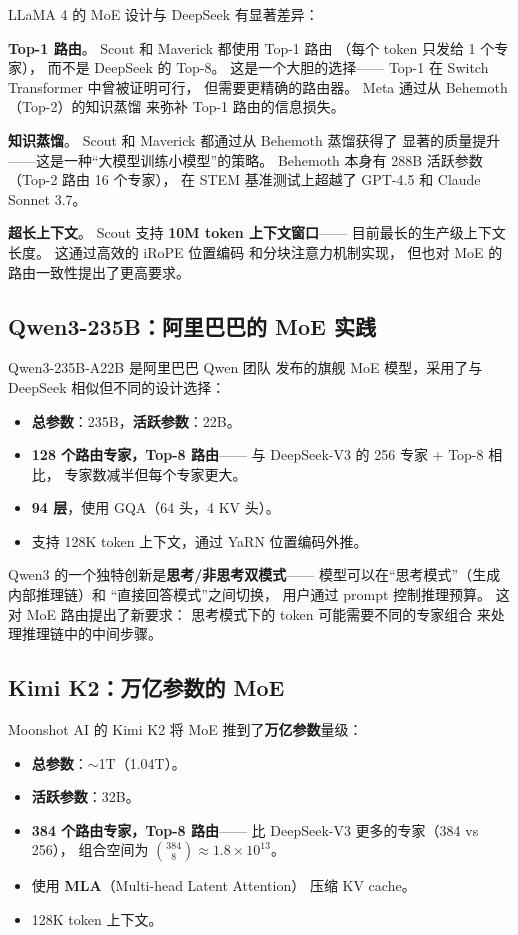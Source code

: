 LLaMA 4 的 MoE 设计与 DeepSeek 有显著差异：

\textbf{Top-1 路由}。
Scout 和 Maverick 都使用 Top-1 路由
（每个 token 只发给 1 个专家），
而不是 DeepSeek 的 Top-8。
这是一个大胆的选择——
Top-1 在 Switch Transformer 中曾被证明可行，
但需要更精确的路由器。
Meta 通过从 Behemoth（Top-2）的知识蒸馏
来弥补 Top-1 路由的信息损失。

\textbf{知识蒸馏}。
Scout 和 Maverick 都通过从 Behemoth 蒸馏获得了
显著的质量提升——这是一种``大模型训练小模型''的策略。
Behemoth 本身有 288B 活跃参数（Top-2 路由 16 个专家），
在 STEM 基准测试上超越了 GPT-4.5 和 Claude Sonnet 3.7。

\textbf{超长上下文}。
Scout 支持 \textbf{10M token 上下文窗口}——
目前最长的生产级上下文长度。
这通过高效的 iRoPE 位置编码
和分块注意力机制实现，
但也对 MoE 的路由一致性提出了更高要求。

\subsection{Qwen3-235B：阿里巴巴的 MoE 实践}

Qwen3-235B-A22B 是阿里巴巴 Qwen 团队%
发布的旗舰 MoE 模型，采用了与 DeepSeek 相似但不同的设计选择：

\begin{itemize}[noitemsep]
  \item \textbf{总参数}：235B，\textbf{活跃参数}：22B。
  \item \textbf{128 个路由专家，Top-8 路由}——
        与 DeepSeek-V3 的 256 专家 + Top-8 相比，
        专家数减半但每个专家更大。
  \item \textbf{94 层}，使用 GQA（64 头，4 KV 头）。
  \item 支持 128K token 上下文，通过 YaRN 位置编码外推。
\end{itemize}

Qwen3 的一个独特创新是\textbf{思考/非思考双模式}——
模型可以在``思考模式''（生成内部推理链）和
``直接回答模式''之间切换，
用户通过 prompt 控制推理预算。
这对 MoE 路由提出了新要求：
思考模式下的 token 可能需要不同的专家组合
来处理推理链中的中间步骤。

\subsection{Kimi K2：万亿参数的 MoE}

Moonshot AI 的 Kimi K2 将 MoE 推到了\textbf{万亿参数}量级：%
\begin{itemize}[noitemsep]
  \item \textbf{总参数}：$\sim$1T（1.04T）。
  \item \textbf{活跃参数}：32B。
  \item \textbf{384 个路由专家，Top-8 路由}——
        比 DeepSeek-V3 更多的专家（384 vs 256），
        组合空间为 $\binom{384}{8} \approx 1.8 \times 10^{13}$。
  \item 使用 \textbf{MLA}（Multi-head Latent Attention）
        压缩 KV cache。
  \item 128K token 上下文。
\end{itemize}

